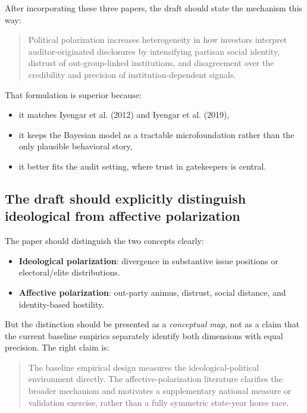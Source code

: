 \documentclass[12pt]{article}
\begin{document}
After incorporating these three papers, the draft should state the mechanism this way:

\begin{quote}
Political polarization increases heterogeneity in how investors interpret auditor-originated disclosures by intensifying partisan social identity, distrust of out-group-linked institutions, and disagreement over the credibility and precision of institution-dependent signals.
\end{quote}

That formulation is superior because:
\begin{itemize}
    \item it matches Iyengar et al. (2012) and Iyengar et al. (2019),
    \item it keeps the Bayesian model as a tractable microfoundation rather than the only plausible behavioral story,
    \item it better fits the audit setting, where trust in gatekeepers is central.
\end{itemize}

\subsection{The draft should explicitly distinguish ideological from affective polarization}

The paper should distinguish the two concepts clearly:
\begin{itemize}
    \item \textbf{Ideological polarization}: divergence in substantive issue positions or electoral/elite distributions.
    \item \textbf{Affective polarization}: out-party animus, distrust, social distance, and identity-based hostility.
\end{itemize}

But the distinction should be presented as a \emph{conceptual map}, not as a claim that the current baseline empirics separately identify both dimensions with equal precision. The right claim is:

\begin{quote}
The baseline empirical design measures the ideological-political environment directly. The affective-polarization literature clarifies the broader mechanism and motivates a supplementary national measure or validation exercise, rather than a fully symmetric state-year horse race.
\end{quote}
\end{document}
